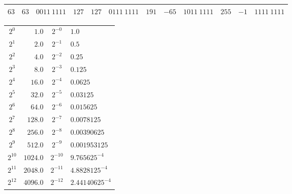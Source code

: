 \begin{center}
\begin{minipage}{0.5\linewidth}
\begin{center}
\begin{tabular}{|c|c|c||c|c|c||c|c|c||c|c|c|}
            \textcolor{numColor}{$63$} & \textcolor{twoColor}{$63$} & $0011~1111$ & \textcolor{numColor}{$127$} & \textcolor{twoColor}{$127$} & $0111~1111$ & \textcolor{numColor}{$191$} & \textcolor{twoColor}{$-65$} & $1011~1111$ & \textcolor{numColor}{$255$} & \textcolor{twoColor}{$-1$} & $1111~1111$\\ 
            \hline
        \end{tabular}
    \end{center}
    \end{minipage}
    \hfill
    \begin{minipage}{0.3\linewidth}
        \begin{center}
            \begin{tabular}{|cr||cl|}
                \hline
                \rowcolor{primaryheader!15}$2^{0}$ & $1.0$ & $2^{-0}$ & $ 1.0$ \\ 
                $2^{1}$ & $2.0$ & $2^{-1}$ & $ 0.5$ \\ 
                $2^{2}$ & $4.0$ & $2^{-2}$ & $ 0.25$ \\ 
                $2^{3}$ & $8.0$ & $2^{-3}$ & $ 0.125$ \\ 
                $2^{4}$ & $16.0$ & $2^{-4}$ & $ 0.0625$ \\ 
                $2^{5}$ & $32.0$ & $2^{-5}$ & $ 0.03125$ \\ 
                $2^{6}$ & $64.0$ & $2^{-6}$ & $ 0.015625$ \\ 
                $2^{7}$ & $128.0$ & $2^{-7}$ & $ 0.0078125$ \\ 
                $2^{8}$ & $256.0$ & $2^{-8}$ & $ 0.00390625$ \\ 
                $2^{9}$ & $512.0$ & $2^{-9}$ & $ 0.001953125$ \\ 
                $2^{10}$ & $1024.0$ & $2^{-10}$ & $ 9.765625^{-4}$ \\ 
                $2^{11}$ & $2048.0$ & $2^{-11}$ & $ 4.8828125^{-4}$ \\ 
                $2^{12}$ & $4096.0$ & $2^{-12}$ & $ 2.44140625^{-4}$ \\ 
                \hline                
            \end{tabular}
        \end{center}
    \end{minipage}
\end{center}